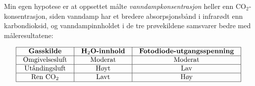 





Min egen hypotese er at oppsettet målte {\it vanndampkonsentrasjon} heller enn CO$_{2}$-konsentrasjon, siden vanndamp har et bredere absorpsjonsbånd i infrarødt enn karbondioksid, og vanndampinnholdet i de tre prøvekildene samsvarer bedre med måleresultatene:


$$\vbox{\offinterlineskip
\halign{\strut
\vrule \quad\hfil # \ \hfil & 
\vrule \quad\hfil # \ \hfil & 
\vrule \quad\hfil # \ \hfil \vrule \cr
\noalign{\hrule}
%
{\bf Gasskilde} & {\bf H$_{2}$O-innhold} & {\bf Fotodiode-utgangsspenning} \cr
%
\noalign{\hrule}
%
Omgivelsesluft & Moderat & Moderat \cr
%
\noalign{\hrule}
%
Utåndingsluft & Høyt & Lav \cr
%
\noalign{\hrule}
%
Ren CO$_{2}$ & Lavt & Høy \cr
%
\noalign{\hrule}
} %
}$$ %




